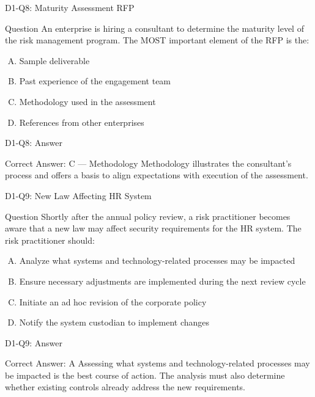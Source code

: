 \documentclass{beamer}
\begin{document}
	\begin{frame}{D1-Q8: Maturity Assessment RFP}
		\begin{block}{Question}
			An enterprise is hiring a consultant to determine the maturity level of the risk management program. The MOST important element of the RFP is the:
		\end{block}
		\begin{enumerate}[(A)]
			\item Sample deliverable
			\item Past experience of the engagement team
			\item Methodology used in the assessment
			\item References from other enterprises
		\end{enumerate}
	\end{frame}
	\begin{frame}{D1-Q8: Answer}
		\begin{block}{Correct Answer: C --- Methodology}
			Methodology illustrates the consultant's process and offers a basis to align expectations with execution of the assessment.
		\end{block}
	\end{frame}
	
	\begin{frame}{D1-Q9: New Law Affecting HR System}
		\begin{block}{Question}
			Shortly after the annual policy review, a risk practitioner becomes aware that a new law may affect security requirements for the HR system. The risk practitioner should:
		\end{block}
		\begin{enumerate}[(A)]
			\item Analyze what systems and technology-related processes may be impacted
			\item Ensure necessary adjustments are implemented during the next review cycle
			\item Initiate an ad hoc revision of the corporate policy
			\item Notify the system custodian to implement changes
		\end{enumerate}
	\end{frame}
	\begin{frame}{D1-Q9: Answer}
		\begin{block}{Correct Answer: A}
			Assessing what systems and technology-related processes may be impacted is the best course of action. The analysis must also determine whether existing controls already address the new requirements.
		\end{block}
	\end{frame}
	
\end{document}
